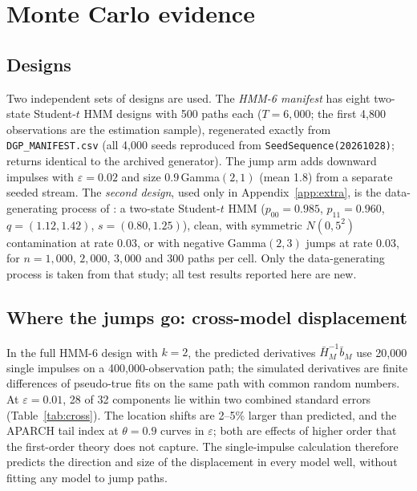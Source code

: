 \documentclass[11pt,a4paper]{article}
\theoremstyle{definition}
\theoremstyle{remark}
\begin{document}
\section{Monte Carlo evidence}\label{sec:mc}
\subsection{Designs}
Two independent sets of designs are used. The \emph{HMM-6 manifest} has eight two-state Student-$t$ HMM designs with 500 paths each ($T=6{,}000$; the first 4{,}800 observations are the estimation sample), regenerated exactly from \texttt{DGP\_MANIFEST.csv} (all 4{,}000 seeds reproduced from \texttt{SeedSequence(20261028)}; returns identical to the archived generator). The jump arm adds downward impulses with $\varepsilon=0.02$ and size $0.9\,$Gamma$(2,1)$ (mean 1.8) from a separate seeded stream. The \emph{second design}, used only in Appendix~\ref{app:extra}, is the data-generating process of \citet{giornoB}: a two-state Student-$t$ HMM ($p_{00}=0.985$, $p_{11}=0.960$, $q=(1.12,1.42)$, $s=(0.80,1.25)$), clean, with symmetric $N(0,5^2)$ contamination at rate 0.03, or with negative Gamma$(2,3)$ jumps at rate 0.03, for $n=1{,}000$, $2{,}000$, $3{,}000$ and 300 paths per cell. Only the data-generating process is taken from that study; all test results reported here are new.

\subsection{Where the jumps go: cross-model displacement}\label{sec:cross}
In the full HMM-6 design with $k=2$, the predicted derivatives $\bar H_M^{-1}\bar b_M$ use 20{,}000 single impulses on a 400{,}000-observation path; the simulated derivatives are finite differences of pseudo-true fits on the same path with common random numbers. At $\varepsilon=0.01$, 28 of 32 components lie within two combined standard errors (Table~\ref{tab:cross}). The location shifts are 2--5\% larger than predicted, and the APARCH tail index at $\theta=0.9$ curves in $\varepsilon$; both are effects of higher order that the first-order theory does not capture. The single-impulse calculation therefore predicts the direction and size of the displacement in every model well, without fitting any model to jump paths.
\end{document}
